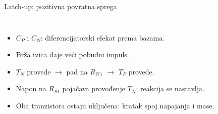 \begin{frame}[label=09_2-s051]{Latch-up: pozitivna povratna sprega}
\begin{columns}[T,onlytextwidth]\centering {}\begin{itemize}
\item $C_P$ i $C_N$: diferencijatorski efekat prema bazama.
\item Brža ivica daje veći pobudni impuls.
\item $T_N$ provede $\rightarrow$ pad na $R_{W1}$ $\rightarrow$ $T_P$ provede.
\item Napon na $R_{S1}$ pojačava provođenje $T_N$; reakcija se nastavlja.
\item Oba tranzistora ostaju uključena: kratak spoj napajanja i mase.
\end{itemize}\end{columns}
\end{frame}
